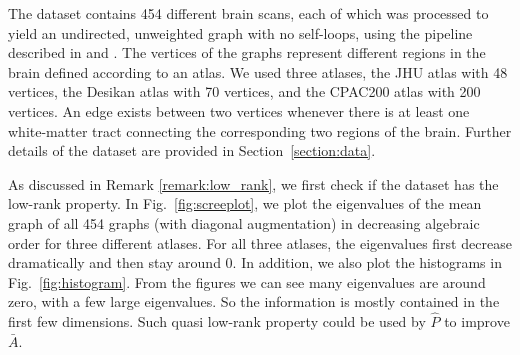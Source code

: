 \documentclass[10pt,letterpaper]{article}
\renewcommand{\hat}{\widehat}
\begin{document}
The dataset contains 454 different brain scans, each of which was processed to yield an undirected, unweighted graph with no self-loops, using the pipeline described in \citet{gray2013migraine} and \citet{kiar2016m2g}.
The vertices of the graphs represent different regions in the brain defined according to an atlas.
We used three atlases, the JHU atlas with 48 vertices, the Desikan atlas with 70 vertices, and the  CPAC200 atlas with 200 vertices.
An edge exists between two vertices whenever there is at least one white-matter tract connecting the corresponding two regions of the brain. 
Further details of the dataset are provided in Section~\ref{section:data}.

As discussed in Remark \ref{remark:low_rank}, we first check if the dataset has the low-rank property. In Fig.~\ref{fig:screeplot}, we plot the eigenvalues of the mean graph of all 454 graphs (with diagonal augmentation) in decreasing algebraic order for three different atlases. For all three atlases, the eigenvalues first decrease dramatically and then stay around 0. In addition, we also plot the histograms in Fig.~\ref{fig:histogram}. From the figures we can see many eigenvalues are around zero, with a few large eigenvalues. So the information is mostly contained in the first few dimensions. Such quasi low-rank property could be used by $\hat{P}$ to improve $\bar{A}$.
\end{document}
